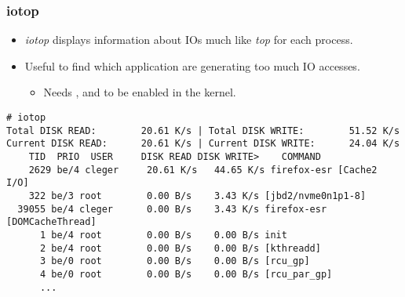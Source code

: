 \begin{frame}[fragile]
  \frametitle{iotop}
  \begin{itemize}
    \item {\em iotop} displays information about IOs much like {\em top} for each
          process.
    \item Useful to find which application are generating too much IO accesses.
    \begin{itemize}
    \item Needs ,
           and
           to be enabled in the kernel.
    \end{itemize}
  \end{itemize}
  \begin{block}{}
    \begin{verbatim}
# iotop
Total DISK READ:        20.61 K/s | Total DISK WRITE:        51.52 K/s
Current DISK READ:      20.61 K/s | Current DISK WRITE:      24.04 K/s
    TID  PRIO  USER     DISK READ DISK WRITE>    COMMAND                                                                                                                                                                                                                        
    2629 be/4 cleger     20.61 K/s   44.65 K/s firefox-esr [Cache2 I/O]
    322 be/3 root        0.00 B/s    3.43 K/s [jbd2/nvme0n1p1-8]
  39055 be/4 cleger      0.00 B/s    3.43 K/s firefox-esr [DOMCacheThread]
      1 be/4 root        0.00 B/s    0.00 B/s init
      2 be/4 root        0.00 B/s    0.00 B/s [kthreadd]
      3 be/0 root        0.00 B/s    0.00 B/s [rcu_gp]
      4 be/0 root        0.00 B/s    0.00 B/s [rcu_par_gp]
      ...
    \end{verbatim}
  \end{block}
\end{frame}

